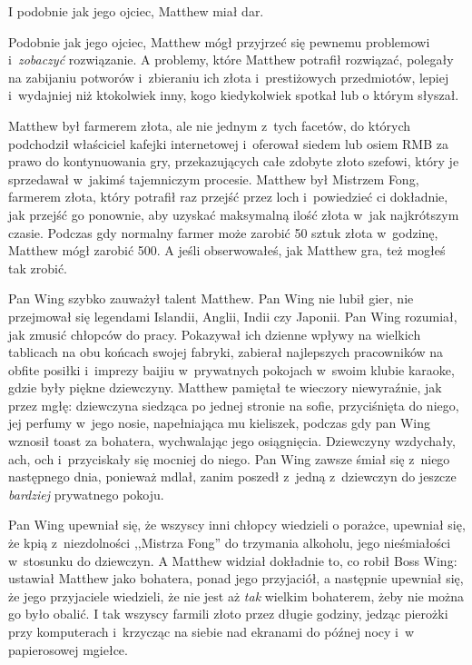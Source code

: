 \documentclass[oneside,polish,11pt,rmheadings]{mwbk}
\begin{document}
I podobnie jak jego ojciec, Matthew miał dar. 


Podobnie jak jego ojciec, Matthew mógł przyjrzeć się pewnemu problemowi i~\textit{zobaczyć }rozwiązanie. A problemy, które Matthew potrafił rozwiązać, polegały na zabijaniu potworów i~zbieraniu ich złota i~prestiżowych przedmiotów, lepiej i~wydajniej niż ktokolwiek inny, kogo kiedykolwiek spotkał lub o którym słyszał. 


Matthew był farmerem złota, ale nie jednym z~tych facetów, do których podchodził właściciel kafejki internetowej i~oferował siedem lub osiem RMB za prawo do kontynuowania gry, przekazujących całe zdobyte złoto szefowi, który je sprzedawał w~jakimś tajemniczym procesie. Matthew był Mistrzem Fong, farmerem złota, który potrafił raz przejść przez loch i~powiedzieć ci dokładnie, jak przejść go ponownie, aby uzyskać maksymalną ilość złota w~jak najkrótszym czasie. Podczas gdy normalny farmer może zarobić 50 sztuk złota w~godzinę, Matthew mógł zarobić 500. A jeśli obserwowałeś, jak Matthew gra, też mogłeś tak zrobić. 


Pan Wing szybko zauważył talent Matthew. Pan Wing nie lubił gier, nie przejmował się legendami Islandii, Anglii, Indii czy Japonii. Pan Wing rozumiał, jak zmusić chłopców do pracy. Pokazywał ich dzienne wpływy na wielkich tablicach na obu końcach swojej fabryki, zabierał najlepszych pracowników na obfite posiłki i~imprezy baijiu w~prywatnych pokojach w~swoim klubie karaoke, gdzie były piękne dziewczyny. Matthew pamiętał te wieczory niewyraźnie, jak przez mgłę: dziewczyna siedząca po jednej stronie na sofie, przyciśnięta do niego, jej perfumy w~jego nosie, napełniająca mu kieliszek, podczas gdy pan Wing wznosił toast za bohatera, wychwalając jego osiągnięcia. Dziewczyny wzdychały, ach, och i~przyciskały się mocniej do niego. Pan Wing zawsze śmiał się z~niego następnego dnia, ponieważ mdlał, zanim poszedł z~jedną z~dziewczyn do jeszcze \textit{bardziej }prywatnego pokoju. 


Pan Wing upewniał się, że wszyscy inni chłopcy wiedzieli o porażce, upewniał się, że kpią z~niezdolności ,,Mistrza Fong'' do trzymania alkoholu, jego nieśmiałości w~stosunku do dziewczyn. A Matthew widział dokładnie to, co robił Boss Wing: ustawiał Matthew jako bohatera, ponad jego przyjaciół, a następnie upewniał się, że jego przyjaciele wiedzieli, że nie jest aż \textit{tak }wielkim bohaterem, żeby nie można go było obalić. I tak wszyscy farmili złoto przez długie godziny, jedząc pierożki przy komputerach i~krzycząc na siebie nad ekranami do późnej nocy i~w papierosowej mgiełce. 
\end{document}
